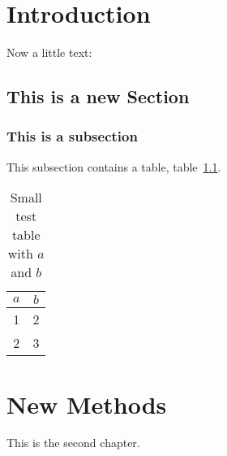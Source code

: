 \documentclass{csuthesis} %
\begin{document}
{\begin{description}
\end{description}
}


\mainmatter %

\chapter{Introduction}

Now a little text: \lipsum[1]

\section{This is a new Section}

\subsection{This is a subsection}

This subsection contains a table, table~\ref{table:smalltab}. \lipsum[1-2]

\begin{table}
\caption[Small Table]{Small test table with $a$ and $b$}
\label{table:smalltab}
\begin{tabular}{c|c}
$a$ & $b$ \\
\hline
1 & 2 \\
2 & 3 \\
\end{tabular}
\end{table}

\chapter{New Methods}

This is the second chapter. 
\end{document}
